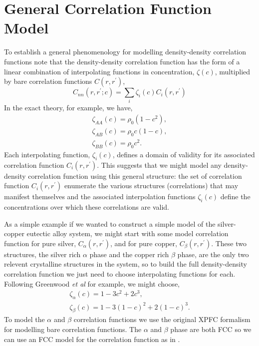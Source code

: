 \section{General Correlation Function Model} %

To establish a general phenomenology for modelling density-density correlation
functions note that the density-density correlation function has the form of a
linear combination of interpolating functions in concentration, $\zeta(c)$,
multiplied by bare correlation functions $C(r, r^\prime)$,
%
\begin{equation}
    C_{nn}(r, r^\prime; c) = \sum_i \zeta_i(c) C_i(r, r^\prime)
\end{equation}
%
In the exact theory, for example, we have,
%
\begin{gather}
    \zeta_{AA}(c) = \rho_0 (1 - c^2), \\
    \zeta_{AB}(c) = \rho_0 c (1 - c ), \\
    \zeta_{BB}(c) = \rho_0 c^2.
\end{gather}
%
Each interpolating function, $\zeta_i(c)$, defines a domain of validity for its
associated correlation function $C_i(r, r^\prime)$. This suggests that we might
model any density-density correlation function using this general structure:
the set of correlation function $C_i(r, r^\prime)$ enumerate the various
structures (correlations) that may manifest themselves and the associated
interpolation functions $\zeta_i(c)$ define the concentrations over which these
correlations are valid.

As a simple example if we wanted to construct a simple model of the
silver-copper eutectic alloy system, we might start with some model correlation
function for pure silver, $C_\alpha(r, r^\prime)$, and for pure copper,
$C_\beta(r, r^\prime)$. These two structures, the silver rich $\alpha$ phase
and the copper rich $\beta$ phase, are the only two relevent crystalline
structures in the system, so to build the full density-density correlation
function we just need to choose interpolating functions for each. Following
Greenwood \textit{et al} for example, we might choose,
%
\begin{gather}
    \zeta_\alpha(c) = 1 - 3c^2 + 2c^3, \\
    \zeta_\beta(c) = 1 - 3 (1 - c)^2 + 2(1 - c)^3.
\end{gather}
%
To model the $\alpha$ and $\beta$ correlation functions we use the original
XPFC formalism for modelling bare correlation functions. The $\alpha$ and
$\beta$ phase are both FCC \cite{SUBRAMANIAN93} so we can use an FCC model for
the correlation function as in \cite{GREENWOOD10}.

